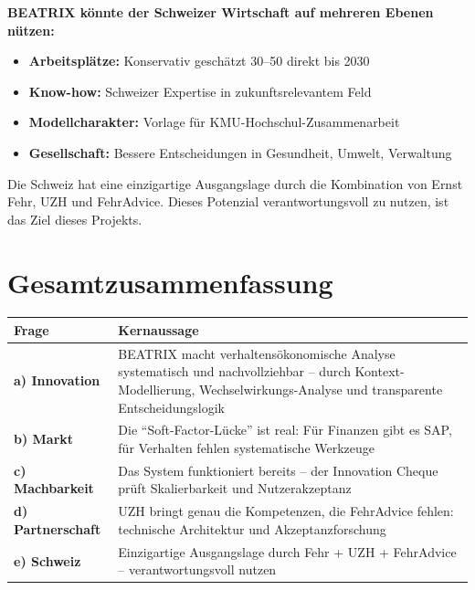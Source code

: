 \documentclass[11pt,a4paper]{article}
\begin{document}
\begin{summarybox}
\textbf{BEATRIX könnte der Schweizer Wirtschaft auf mehreren Ebenen nützen:}

\begin{itemize}[noitemsep]
    \item \textbf{Arbeitsplätze:} Konservativ geschätzt 30--50 direkt bis 2030
    \item \textbf{Know-how:} Schweizer Expertise in zukunftsrelevantem Feld
    \item \textbf{Modellcharakter:} Vorlage für KMU-Hochschul-Zusammenarbeit
    \item \textbf{Gesellschaft:} Bessere Entscheidungen in Gesundheit, Umwelt, Verwaltung
\end{itemize}

Die Schweiz hat eine einzigartige Ausgangslage durch die Kombination von Ernst Fehr, UZH und FehrAdvice. Dieses Potenzial verantwortungsvoll zu nutzen, ist das Ziel dieses Projekts.
\end{summarybox}

\newpage

\section*{Gesamtzusammenfassung}

\begin{table}[h]
\centering
\begin{tabularx}{\textwidth}{lX}
\toprule
\textbf{Frage} & \textbf{Kernaussage} \\
\midrule
\textbf{a) Innovation} & BEATRIX macht verhaltensökonomische Analyse systematisch und nachvollziehbar -- durch Kontext-Modellierung, Wechselwirkungs-Analyse und transparente Entscheidungslogik \\
\textbf{b) Markt} & Die ``Soft-Factor-Lücke'' ist real: Für Finanzen gibt es SAP, für Verhalten fehlen systematische Werkzeuge \\
\textbf{c) Machbarkeit} & Das System funktioniert bereits -- der Innovation Cheque prüft Skalierbarkeit und Nutzerakzeptanz \\
\textbf{d) Partnerschaft} & UZH bringt genau die Kompetenzen, die FehrAdvice fehlen: technische Architektur und Akzeptanzforschung \\
\textbf{e) Schweiz} & Einzigartige Ausgangslage durch Fehr + UZH + FehrAdvice -- verantwortungsvoll nutzen \\
\bottomrule
\end{tabularx}
\end{table}
\end{document}
